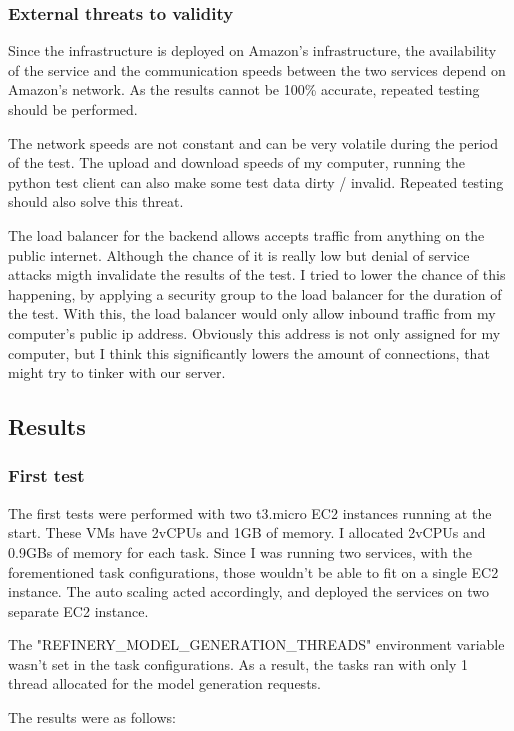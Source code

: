 		\subsubsection{External threats to validity}
			Since the infrastructure is deployed on Amazon's infrastructure, the availability of the service and the communication speeds between the two services 
			depend on Amazon's network. As the results cannot be 100\% accurate, repeated testing should be
			performed.

			The network speeds are not constant and can be very volatile during the period of the test. The upload and download speeds of my computer, running the 
			python test client can also make some test data dirty / invalid.  Repeated testing should also solve this threat.

			The load balancer for the backend allows accepts traffic from anything on the public internet. Although the chance of it is really low
			but denial of service attacks migth invalidate the results of the test. I tried to lower the chance of this happening, by applying a security group
			to the load balancer for the duration of the test. With this, the load balancer would only allow inbound traffic from my computer's public ip address.
			Obviously this address is not only assigned for my computer, but I think this significantly lowers the amount of connections, that might try to tinker
			with our server.

		\subsection{Results}
		\subsubsection{First test} \label{firsttest}
		The first tests were performed with two t3.micro EC2 instances running at the start. These VMs have 2vCPUs and 1GB of memory. I allocated
		2vCPUs and 0.9GBs of memory for each task. Since I was running two services, with the forementioned task configurations, 
		those wouldn't be able to fit on a single EC2 instance. The auto scaling acted accordingly, and deployed the services on two 
		separate EC2 instance. 

		The "REFINERY\_MODEL\_GENERATION\_THREADS" environment variable wasn't set in the task configurations. As a result, the tasks ran with only 1 thread
		allocated for the model generation requests.

		The results were as follows:

